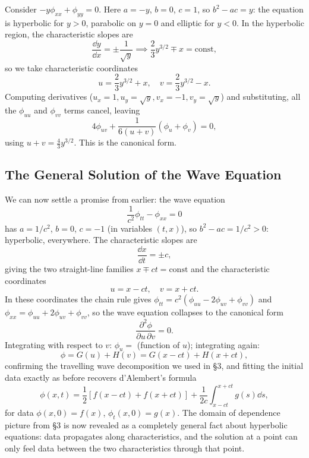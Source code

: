 \begin{example}
    Consider $-y \phi_{xx} + \phi_{yy} = 0$. Here $a = -y$, $b = 0$, $c = 1$, so $b^2 - ac = y$: the equation is hyperbolic for $y > 0$, parabolic on $y = 0$ and elliptic for $y < 0$.
    In the hyperbolic region, the characteristic slopes are
    $$
    \frac{\dd y}{\dd x} = \pm \frac{1}{\sqrt{y}} \implies \frac{2}{3} y^{3/2} \mp x = \text{const},
    $$
    so we take characteristic coordinates
    $$
    u = \frac{2}{3}y^{3/2} + x, \quad v = \frac{2}{3} y^{3/2} - x.
    $$
    Computing derivatives ($u_x = 1, u_y = \sqrt{y}, v_x = -1, v_y = \sqrt{y}$) and substituting, all the $\phi_{uu}$ and $\phi_{vv}$ terms cancel, leaving
    $$
    4 \phi_{uv} + \frac{1}{6 (u + v)}\left(\phi_u + \phi_v\right) = 0,
    $$
    using $u + v = \frac{4}{3}y^{3/2}$. This is the canonical form.
\end{example}

\subsection{The General Solution of the Wave Equation}

We can now settle a promise from earlier: the wave equation
$$
\frac{1}{c^2}\phi_{tt} - \phi_{xx} = 0
$$
has $a = 1/c^2$, $b = 0$, $c = -1$ (in variables $(t, x)$), so $b^2 - ac = 1/c^2 > 0$: hyperbolic, everywhere. The characteristic slopes are
$$
\frac{\dd x}{\dd t} = \pm c,
$$
giving the two straight-line families $x \mp ct = \text{const}$ and the characteristic coordinates
$$
u = x - ct, \quad v = x + ct.
$$
In these coordinates the chain rule gives $\phi_{tt} = c^2(\phi_{uu} - 2 \phi_{uv} + \phi_{vv})$ and $\phi_{xx} = \phi_{uu} + 2\phi_{uv} + \phi_{vv}$, so the wave equation collapses to the canonical form
$$
\frac{\partial^2 \phi}{\partial u \, \partial v} = 0.
$$
Integrating with respect to $v$: $\phi_u = $ (function of $u$); integrating again:
$$
\phi = G(u) + H(v) = G(x - ct) + H(x + ct),
$$
confirming the travelling wave decomposition we used in \S 3, and fitting the initial data exactly as before recovers d'Alembert's formula
$$
\phi(x, t) = \frac{1}{2}\left[f(x - ct) + f(x + ct)\right] + \frac{1}{2c}\int_{x - ct}^{x + ct} g(s) \dd s,
$$
for data $\phi(x, 0) = f(x)$, $\phi_t(x, 0) = g(x)$. The domain of dependence picture from \S 3 is now revealed as a completely general fact about hyperbolic equations: data propagates along characteristics, and the solution at a point can only feel data between the two characteristics through that point.

